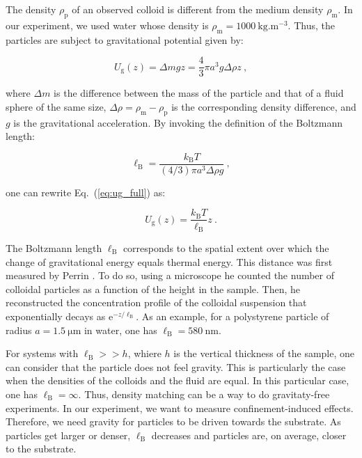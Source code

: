 The density $\rho_\mathrm{p}$ of an observed colloid is different from the medium density $\rho_\mathrm{m}$. In our experiment, we used water whose density is $\rho_\mathrm{m} = 1000 ~ \mathrm{kg.m^{-3}}$. Thus, the particles are subject to gravitational potential given by:

\begin{equation}
	U_\mathrm{g} (z) = \Delta m g z = \frac{4}{3}\pi a ^3 g \Delta \rho z ~,
	\label{eq:ug_full}
\end{equation}

where $\Delta m$ is the difference between the mass of the particle and that of a fluid sphere of the same size, $\Delta \rho = \rho_\mathrm{m} - \rho_\mathrm{p}$ is the corresponding density difference, and $g$ is the gravitational acceleration. By invoking the definition of the Boltzmann length:

\begin{equation}
	\ell _\mathrm{B} = \frac{k_\mathrm{B}T}{(4/3) \pi a ^3 \Delta \rho g } ~,
\end{equation}

one can rewrite Eq.~(\ref{eq:ug_full}) as:

\begin{equation}
	U_\mathrm{g}(z) = \frac{k_\mathrm{B}T}{\ell _\mathrm{B}}z ~.
	\label{eq:ug}
\end{equation}

The Boltzmann length $\ell_\mathrm{B}$ corresponds to the spatial extent over which the change of gravitational energy equals thermal energy. This distance was first measured by Perrin \cite{perrin_les_2014}. To do so, using a microscope he counted the number of colloidal particles as a function of the height in the sample. Then, he reconstructed the concentration profile of the colloidal suspension that exponentially decays as $\mathrm{e}^{- z / \ell _\mathrm{B}}$. As an example, for a polystyrene particle of radius $a  = 1.5 ~ \mathrm{\mu m}$ in water, one has $\ell _\mathrm{B} = 580 ~ \mathrm{nm}$.

For systems with $\ell _\mathrm{B} >> h $, whiere $h$ is the vertical thickness of the sample, one can consider that the particle does not feel gravity. This is particularly the case when the densities of the colloids and the fluid are equal. In this particular case, one has $\ell _\mathrm{B} = \infty$. Thus, density matching can be a way to do gravitaty-free experiments. In our experiment, we want to measure confinement-induced effects. Therefore, we need gravity for particles to be driven towards the substrate. As particles get larger or denser, $\ell _\mathrm{B}$ decreases and particles are, on average, closer to the substrate. 


